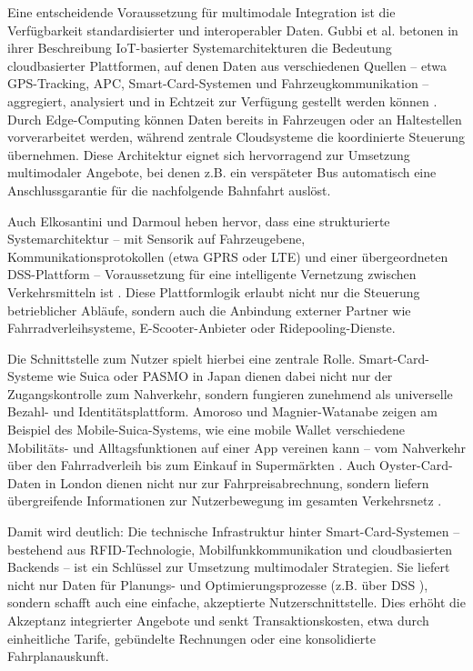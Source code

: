Eine entscheidende Voraussetzung für multimodale Integration ist die Verfügbarkeit standardisierter und interoperabler Daten. Gubbi et al. betonen in ihrer Beschreibung IoT-basierter Systemarchitekturen die Bedeutung cloudbasierter Plattformen, auf denen Daten aus verschiedenen Quellen – etwa GPS-Tracking, APC, Smart-Card-Systemen und Fahrzeugkommunikation – aggregiert, analysiert und in Echtzeit zur Verfügung gestellt werden können \cite{Gubbi2013}. Durch Edge-Computing können Daten bereits in Fahrzeugen oder an Haltestellen vorverarbeitet werden, während zentrale Cloudsysteme die koordinierte Steuerung übernehmen. Diese Architektur eignet sich hervorragend zur Umsetzung multimodaler Angebote, bei denen z.B. ein verspäteter Bus automatisch eine Anschlussgarantie für die nachfolgende Bahnfahrt auslöst.

Auch Elkosantini und Darmoul heben hervor, dass eine strukturierte Systemarchitektur – mit Sensorik auf Fahrzeugebene, Kommunikationsprotokollen (etwa GPRS oder LTE) und einer übergeordneten DSS-Plattform – Voraussetzung für eine intelligente Vernetzung zwischen Verkehrsmitteln ist \cite{Elkosantini2013}. Diese Plattformlogik erlaubt nicht nur die Steuerung betrieblicher Abläufe, sondern auch die Anbindung externer Partner wie Fahrradverleihsysteme, E-Scooter-Anbieter oder Ridepooling-Dienste.

Die Schnittstelle zum Nutzer spielt hierbei eine zentrale Rolle. Smart-Card-Systeme wie Suica oder PASMO in Japan dienen dabei nicht nur der Zugangskontrolle zum Nahverkehr, sondern fungieren zunehmend als universelle Bezahl- und Identitätsplattform. Amoroso und Magnier-Watanabe zeigen am Beispiel des Mobile-Suica-Systems, wie eine mobile Wallet verschiedene Mobilitäts- und Alltagsfunktionen auf einer App vereinen kann – vom Nahverkehr über den Fahrradverleih bis zum Einkauf in Supermärkten \cite{Amoroso2011}. Auch Oyster-Card-Daten in London dienen nicht nur zur Fahrpreisabrechnung, sondern liefern übergreifende Informationen zur Nutzerbewegung im gesamten Verkehrsnetz \cite{Fu2012}.

Damit wird deutlich: Die technische Infrastruktur hinter Smart-Card-Systemen – bestehend aus RFID-Technologie, Mobilfunkkommunikation und cloudbasierten Backends – ist ein Schlüssel zur Umsetzung multimodaler Strategien. Sie liefert nicht nur Daten für Planungs- und Optimierungsprozesse (z.B. über DSS \cite{AlOmar2012}), sondern schafft auch eine einfache, akzeptierte Nutzerschnittstelle. Dies erhöht die Akzeptanz integrierter Angebote und senkt Transaktionskosten, etwa durch einheitliche Tarife, gebündelte Rechnungen oder eine konsolidierte Fahrplanauskunft.

